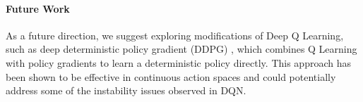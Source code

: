 \documentclass{article}
\begin{document}
\paragraph{Future Work} As a future direction, we suggest exploring modifications of Deep Q Learning,
such as deep deterministic policy gradient (DDPG) \cite{ddpg}, which combines Q
Learning with policy gradients to learn a deterministic policy directly. This
approach has been shown to be effective in continuous action spaces and could
potentially address some of the instability issues observed in DQN.

\newpage
\nocite{*}


\end{document}
